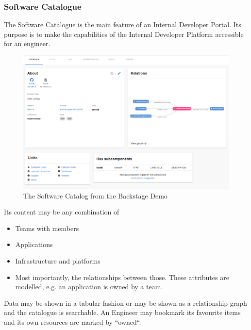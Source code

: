 \documentclass[a4paper,12pt]{article}
\begin{document}
    \subsubsection{Software Catalogue}
    The Software Catalogue is the main feature of an Internal Developer Portal.
    Its purpose is to make the capabilities of the Internal Developer Platform accessible for an engineer.

    \begin{figure}
        \includegraphics[width=\linewidth]{backstage_item_details}
        \caption{The Software Catalog from the Backstage Demo\parencite{backstagedemo}}
        \label{fig:catalog}
    \end{figure}

    Its content may be any combination of
    \begin{itemize}
        \item Teams with members
        \item Applications
        \item Infrastructure and platforms
        \item Most importantly, the relationships between those. These attributes are modelled, e.g. an application is owned by a team.
    \end{itemize}
    Data may be shown in a tabular fashion or may be shown as a relationship graph and the catalogue is searchable.
    An Engineer may bookmark its favourite items and its own resources are marked by ``owned``.
\end{document}
